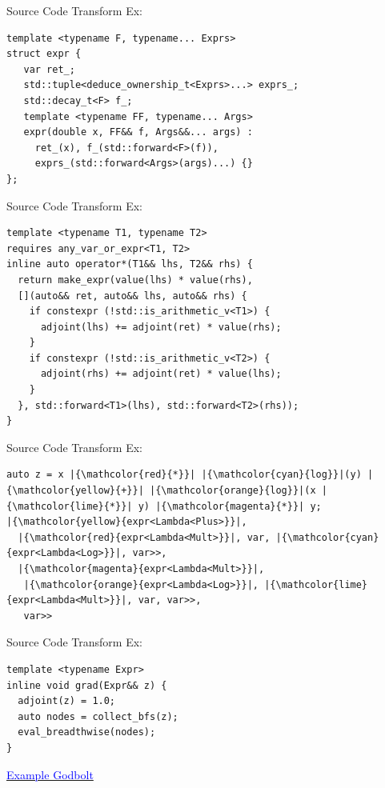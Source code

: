\documentclass[dvipsnames]{beamer}
\makeatletter
\def\mathcolor#1#{\@mathcolor{#1}}
\def\@mathcolor#1#2#3{%
  \protect\leavevmode
  \begingroup
    \color#1{#2}#3%
  \endgroup
}
\makeatother
\begin{document}
\begin{frame}[fragile]{Source Code Transform Ex:}
\begin{verbatim}
template <typename F, typename... Exprs>
struct expr {
   var ret_;
   std::tuple<deduce_ownership_t<Exprs>...> exprs_;
   std::decay_t<F> f_;
   template <typename FF, typename... Args>
   expr(double x, FF&& f, Args&&... args) :
     ret_(x), f_(std::forward<F>(f)),
     exprs_(std::forward<Args>(args)...) {}
};
\end{verbatim}
\end{frame}

\begin{frame}[fragile]{Source Code Transform Ex:}
\begin{verbatim}
template <typename T1, typename T2>
requires any_var_or_expr<T1, T2>
inline auto operator*(T1&& lhs, T2&& rhs) {
  return make_expr(value(lhs) * value(rhs),
  [](auto&& ret, auto&& lhs, auto&& rhs) {
    if constexpr (!std::is_arithmetic_v<T1>) {
      adjoint(lhs) += adjoint(ret) * value(rhs);
    }
    if constexpr (!std::is_arithmetic_v<T2>) {
      adjoint(rhs) += adjoint(ret) * value(lhs);
    }
  }, std::forward<T1>(lhs), std::forward<T2>(rhs));
}
\end{verbatim}
\end{frame}

\begin{frame}[fragile]{Source Code Transform Ex:}
\begin{verbatim}
auto z = x |{\mathcolor{red}{*}}| |{\mathcolor{cyan}{log}}|(y) |{\mathcolor{yellow}{+}}| |{\mathcolor{orange}{log}}|(x |{\mathcolor{lime}{*}}| y) |{\mathcolor{magenta}{*}}| y;
|{\mathcolor{yellow}{expr<Lambda<Plus>}}|,
  |{\mathcolor{red}{expr<Lambda<Mult>}}|, var, |{\mathcolor{cyan}{expr<Lambda<Log>}}|, var>>,
  |{\mathcolor{magenta}{expr<Lambda<Mult>}}|,
   |{\mathcolor{orange}{expr<Lambda<Log>}}|, |{\mathcolor{lime}{expr<Lambda<Mult>}}|, var, var>>,
   var>>
\end{verbatim}
\end{frame}

\begin{frame}[fragile]{Source Code Transform Ex:}
\begin{verbatim}
template <typename Expr>
inline void grad(Expr&& z) {
  adjoint(z) = 1.0;
  auto nodes = collect_bfs(z);
  eval_breadthwise(nodes);
}
\end{verbatim}
\centerline{\href{https://godbolt.org/z/veexMT5vz}{\textcolor{blue}{Example Godbolt}}}
\end{frame}
\end{document}
